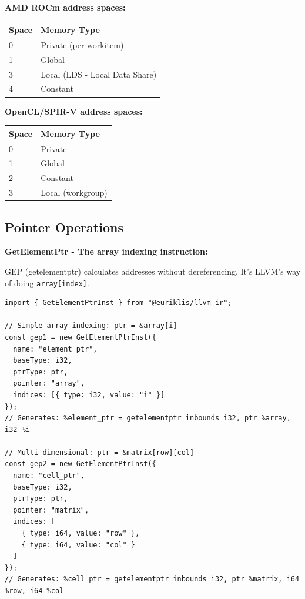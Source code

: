 \documentclass[11pt]{article}
\begin{document}
\textbf{AMD ROCm address spaces:}
\begin{center}
\begin{tabular}{|l|l|}
\hline
\textbf{Space} & \textbf{Memory Type} \\
\hline
0 & Private (per-workitem) \\
1 & Global \\
3 & Local (LDS - Local Data Share) \\
4 & Constant \\
\hline
\end{tabular}
\end{center}

\textbf{OpenCL/SPIR-V address spaces:}
\begin{center}
\begin{tabular}{|l|l|}
\hline
\textbf{Space} & \textbf{Memory Type} \\
\hline
0 & Private \\
1 & Global \\
2 & Constant \\
3 & Local (workgroup) \\
\hline
\end{tabular}
\end{center}

\subsection{Pointer Operations}

\textbf{GetElementPtr - The array indexing instruction:}

GEP (getelementptr) calculates addresses without dereferencing. It's LLVM's way of doing \texttt{array[index]}.

\begin{lstlisting}[style=ts]
import { GetElementPtrInst } from "@euriklis/llvm-ir";

// Simple array indexing: ptr = &array[i]
const gep1 = new GetElementPtrInst({
  name: "element_ptr",
  baseType: i32,
  ptrType: ptr,
  pointer: "array",
  indices: [{ type: i32, value: "i" }]
});
// Generates: %element_ptr = getelementptr inbounds i32, ptr %array, i32 %i

// Multi-dimensional: ptr = &matrix[row][col]
const gep2 = new GetElementPtrInst({
  name: "cell_ptr",
  baseType: i32,
  ptrType: ptr,
  pointer: "matrix",
  indices: [
    { type: i64, value: "row" },
    { type: i64, value: "col" }
  ]
});
// Generates: %cell_ptr = getelementptr inbounds i32, ptr %matrix, i64 %row, i64 %col
\end{lstlisting}
\end{document}
